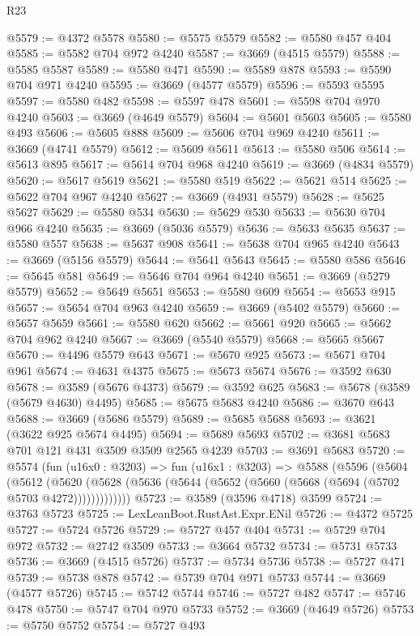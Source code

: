 \begin{lexlean}{R23}
\begin{coremodule}
@5579 := @4372 @5578
@5580 := @5575 @5579
@5582 := @5580 @457 @404
@5585 := @5582 @704 @972 @4240
@5587 := @3669 (@4515 @5579)
@5588 := @5585 @5587
@5589 := @5580 @471
@5590 := @5589 @878
@5593 := @5590 @704 @971 @4240
@5595 := @3669 (@4577 @5579)
@5596 := @5593 @5595
@5597 := @5580 @482
@5598 := @5597 @478
@5601 := @5598 @704 @970 @4240
@5603 := @3669 (@4649 @5579)
@5604 := @5601 @5603
@5605 := @5580 @493
@5606 := @5605 @888
@5609 := @5606 @704 @969 @4240
@5611 := @3669 (@4741 @5579)
@5612 := @5609 @5611
@5613 := @5580 @506
@5614 := @5613 @895
@5617 := @5614 @704 @968 @4240
@5619 := @3669 (@4834 @5579)
@5620 := @5617 @5619
@5621 := @5580 @519
@5622 := @5621 @514
@5625 := @5622 @704 @967 @4240
@5627 := @3669 (@4931 @5579)
@5628 := @5625 @5627
@5629 := @5580 @534
@5630 := @5629 @530
@5633 := @5630 @704 @966 @4240
@5635 := @3669 (@5036 @5579)
@5636 := @5633 @5635
@5637 := @5580 @557
@5638 := @5637 @908
@5641 := @5638 @704 @965 @4240
@5643 := @3669 (@5156 @5579)
@5644 := @5641 @5643
@5645 := @5580 @586
@5646 := @5645 @581
@5649 := @5646 @704 @964 @4240
@5651 := @3669 (@5279 @5579)
@5652 := @5649 @5651
@5653 := @5580 @609
@5654 := @5653 @915
@5657 := @5654 @704 @963 @4240
@5659 := @3669 (@5402 @5579)
@5660 := @5657 @5659
@5661 := @5580 @620
@5662 := @5661 @920
@5665 := @5662 @704 @962 @4240
@5667 := @3669 (@5540 @5579)
@5668 := @5665 @5667
@5670 := @4496 @5579 @643
@5671 := @5670 @925
@5673 := @5671 @704 @961
@5674 := @4631 @4375
@5675 := @5673 @5674
@5676 := @3592 @630
@5678 := @3589 (@5676 @4373)
@5679 := @3592 @625
@5683 := @5678 (@3589 (@5679 @4630) @4495)
@5685 := @5675 @5683 @4240
@5686 := @3670 @643
@5688 := @3669 (@5686 @5579)
@5689 := @5685 @5688
@5693 := @3621 (@3622 @925 @5674 @4495)
@5694 := @5689 @5693
@5702 := @3681 @5683 @701 @121 @431 @3509 @3509 @2565 @4239
@5703 := @3691 @5683
@5720 := @5574
    (fun (u16x0 : @3203) =>
    fun (u16x1 : @3203) =>
    @5588
      (@5596
        (@5604
          (@5612
            (@5620 (@5628 (@5636 (@5644 (@5652 (@5660 (@5668 (@5694 (@5702 @5703 @4272)))))))))))))
@5723 := @3589 (@3596 @4718) @3599
@5724 := @3763 @5723
@5725 := LexLeanBoot.RustAst.Expr.ENil
@5726 := @4372 @5725
@5727 := @5724 @5726
@5729 := @5727 @457 @404
@5731 := @5729 @704 @972
@5732 := @2742 @3509
@5733 := @3664 @5732
@5734 := @5731 @5733
@5736 := @3669 (@4515 @5726)
@5737 := @5734 @5736
@5738 := @5727 @471
@5739 := @5738 @878
@5742 := @5739 @704 @971 @5733
@5744 := @3669 (@4577 @5726)
@5745 := @5742 @5744
@5746 := @5727 @482
@5747 := @5746 @478
@5750 := @5747 @704 @970 @5733
@5752 := @3669 (@4649 @5726)
@5753 := @5750 @5752
@5754 := @5727 @493

\end{coremodule}
\end{lexlean}

